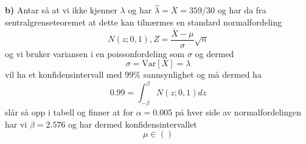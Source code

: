 \documentclass{report}
\newcommand{\nbrack}[1]{\left( #1 \right)}
\newcommand{\bbrack}[1]{\left[ #1 \right]}
\newcommand{\Var}[1]{\text{Var} \bbrack{ #1 }}
\begin{document}
\textbf{b)}
Antar så at vi ikke kjenner $\lambda$ og har $\hat{\lambda} = \overline{X} = 359/30$ og har da fra sentralgrenseteoremet at dette kan tilnærmes en standard normalfordeling
\begin{equation}
  \label{eq:10}
  N(z; 0,1), Z = \frac{\overline{X} - \mu}{\sigma} \sqrt{n}
\end{equation}
og vi bruker variansen i en poissonfordeling som $\sigma$ og dermed
\begin{equation}
  \label{eq:13}
  \sigma = \Var{X} = \lambda
\end{equation}
vil ha et konfidensintervall med $99\%$ sannsynlighet og må dermed ha
\begin{equation}
  \label{eq:11}
  0.99 = \int_{-\beta}^{\beta} N(z; 0, 1) dz
\end{equation}
slår så opp i tabell og finner at for $\alpha = 0.005$ på hver side av normalfordelingen har vi $\beta = 2.576$ og har dermed konfidensintervallet
\begin{equation}
  \label{eq:12}
  \mu \in \nbrack{  }
\end{equation}
\end{document}
